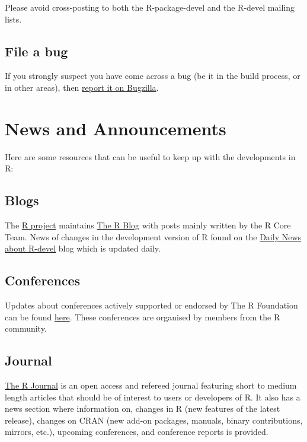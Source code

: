 \documentclass[
]{book}
\begin{document}
Please avoid cross-posting to both the R-package-devel and the R-devel mailing lists.

\hypertarget{file-a-bug}{%
\section{File a bug}\label{file-a-bug}}

If you strongly suspect you have come across a bug (be it in the build process, or in other areas), then \protect\hyperlink{ReportBug}{report it on Bugzilla}.

\hypertarget{News}{%
\chapter{News and Announcements}\label{News}}

Here are some resources that can be useful to keep up with the developments in R:

\hypertarget{blogs}{%
\section{Blogs}\label{blogs}}

The \href{https://www.r-project.org/}{R project} maintains \href{https://blog.r-project.org/}{The R Blog} with posts mainly written by the R Core Team. News of changes in the development version of R found on the \href{https://developer.r-project.org/blosxom.cgi/R-devel}{Daily News about R-devel} blog which is updated daily.

\hypertarget{conferences}{%
\section{Conferences}\label{conferences}}

Updates about conferences actively supported or endorsed by The R Foundation can be found \href{https://www.r-project.org/conferences/}{here}. These conferences are organised by members from the R community.

\hypertarget{journal}{%
\section{Journal}\label{journal}}

\href{https://journal.r-project.org/}{The R Journal} is an open access and refereed journal featuring short to medium length articles that should be of interest to users or developers of R. It also has a news section where information on, changes in R (new features of the latest release), changes on CRAN (new add-on packages, manuals, binary contributions, mirrors, etc.), upcoming conferences, and conference reports is provided.
\end{document}
